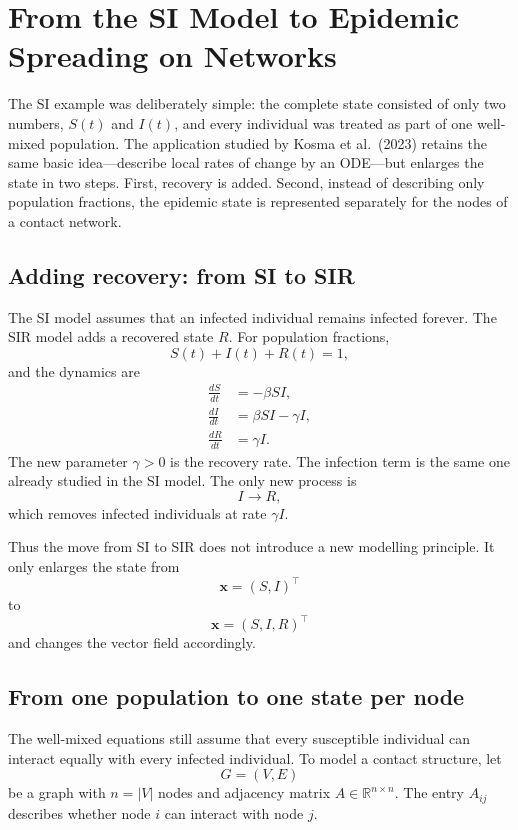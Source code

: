 \documentclass[11pt,a4paper]{article}
\begin{document}
\section{From the SI Model to Epidemic Spreading on Networks}
\label{sec:networks}

The SI example was deliberately simple: the complete state consisted of only
two numbers, $S(t)$ and $I(t)$, and every individual was treated as part of one
well-mixed population. The application studied by Kosma et al.\ (2023) retains
the same basic idea---describe local rates of change by an ODE---but enlarges
the state in two steps. First, recovery is added. Second, instead of describing
only population fractions, the epidemic state is represented separately for
the nodes of a contact network.


\subsection{Adding recovery: from SI to SIR}

The SI model assumes that an infected individual remains infected forever. The
SIR model adds a recovered state $R$. For population fractions,
\[
    S(t)+I(t)+R(t)=1,
\]
and the dynamics are
\begin{align}
    \frac{dS}{dt} &= -\beta SI, \\
    \frac{dI}{dt} &=  \beta SI-\gamma I, \\
    \frac{dR}{dt} &=  \gamma I .
\end{align}
The new parameter $\gamma>0$ is the recovery rate. The infection term is the
same one already studied in the SI model. The only new process is
\[
    I \longrightarrow R,
\]
which removes infected individuals at rate $\gamma I$.

Thus the move from SI to SIR does not introduce a new modelling principle. It
only enlarges the state from
\[
    \mathbf{x}=(S,I)^\top
\]
to
\[
    \mathbf{x}=(S,I,R)^\top
\]
and changes the vector field accordingly.


\subsection{From one population to one state per node}

The well-mixed equations still assume that every susceptible individual can
interact equally with every infected individual. To model a contact structure,
let
\[
    G=(V,E)
\]
be a graph with $n=|V|$ nodes and adjacency matrix
$A\in\mathbb{R}^{n\times n}$. The entry $A_{ij}$ describes whether node $i$
can interact with node $j$.
\end{document}
